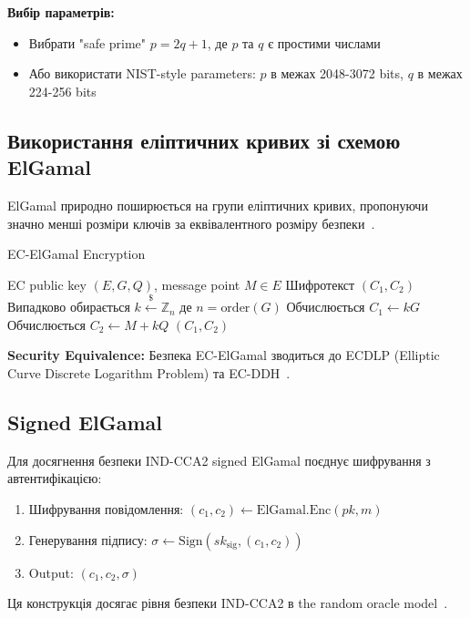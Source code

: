 \textbf{Вибір параметрів:}
\begin{itemize}
    \item Вибрати "safe prime"{} $p = 2q + 1$, де $p$ та $q$ є простими числами
    \item Або використати NIST-style parameters: $p$ в межах 2048-3072 bits, $q$ в межах 224-256 bits
\end{itemize}

\subsection{Використання еліптичних кривих зі схемою ElGamal}

ElGamal природно поширюється на групи еліптичних кривих, пропонуючи значно менші розміри ключів за еквівалентного 
розміру безпеки~\cite{koblitz1987elliptic, miller1986use}.

\begin{algorithm}
    \caption{EC-ElGamal Encryption}
    \begin{algorithmic}[1]
        \Require EC public key $(E, G, Q)$, message point $M \in E$
        \Ensure Шифротекст $(C_1, C_2)$
        \State Випадково обирається $k \xleftarrow{\$} \mathbb{Z}_n$ де $n = \text{order}(G)$
        \State Обчислюється $C_1 \gets kG$
        \State Обчислюється $C_2 \gets M + kQ$
        \State \Return $(C_1, C_2)$
    \end{algorithmic}
\end{algorithm}

\textbf{Security Equivalence:} Безпека EC-ElGamal зводиться до ECDLP (Elliptic Curve Discrete Logarithm Problem) 
та EC-DDH~\cite{hankerson2006guide}.

\subsection{Signed ElGamal}

Для досягнення безпеки IND-CCA2 signed ElGamal поєднує шифрування з автентифікацією:

\begin{enumerate}
    \item Шифрування повідомлення: $(c_1, c_2) \gets \text{ElGamal.Enc}(pk, m)$
    \item Генерування підпису: $\sigma \gets \text{Sign}(sk_{\text{sig}}, (c_1, c_2))$
    \item Output: $(c_1, c_2, \sigma)$
\end{enumerate}

Ця конструкція досягає рівня безпеки IND-CCA2 в the random oracle model~\cite{bellare1993random}.

